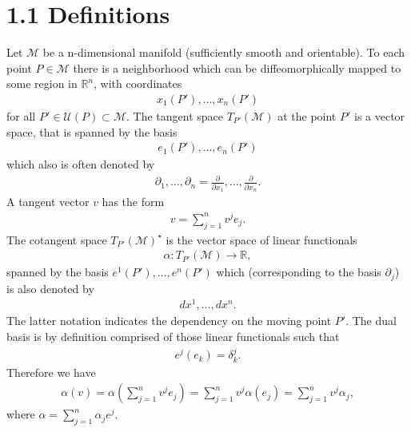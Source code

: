 \documentclass[letterpaper,10pt,english]{sphinxmanual}
\begin{document}
\section{1.1 Definitions}
\label{section-1.0:definitions}
Let \(\mathcal{M}\) be a n-dimensional manifold (sufficiently smooth and
orientable). To each point \(P \in \mathcal{M}\) there is a neighborhood
which can be diffeomorphically mapped to some region in \(\mathbb{R}^n\),
with coordinates
\begin{equation*}
\begin{split}x_1 (P'), \ldots, x_n (P')\end{split}
\end{equation*}
for all \(P' \in \mathcal{U} (P) \subset \mathcal{M}\). The tangent space
\(T_{P'} (\mathcal{M})\) at the point \(P'\) is a vector space, that
is spanned by the basis
\begin{equation*}
\begin{split}e_1 (P'), \ldots, e_n (P')\end{split}
\end{equation*}
which also is often denoted by
\begin{equation*}
\begin{split}\partial_1, \ldots, \partial_n =
 \frac{\partial}{\partial x_1}, \ldots,
 \frac{\partial}{\partial x_n}.\end{split}
\end{equation*}
A tangent vector \(v\) has the form
\begin{equation*}
\begin{split}v = \sum_{j = 1}^n v^j e_j .\end{split}
\end{equation*}
The cotangent space \(T_{P'}^{} (\mathcal{M})^{\star}\) is the vector space
of linear functionals
\begin{equation*}
\begin{split}\alpha : T_{P'} (\mathcal{M}) \rightarrow \mathbb{R},\end{split}
\end{equation*}
spanned by the basis \(e^1 (P'), \ldots, e^n (P')\)
which (corresponding to the basis \(\partial_j\)) is also denoted by
\begin{equation*}
\begin{split}d x^1,\ldots, d x^n.\end{split}
\end{equation*}
The latter notation indicates the dependency on the moving
point \(P'\). The dual basis is by definition comprised of those linear
functionals such that
\begin{equation*}
\begin{split}e^j (e_k) = \delta^j_k .\end{split}
\end{equation*}
Therefore we have
\begin{equation*}
\begin{split}\alpha (v) = \alpha \left( \sum_{j = 1}^n v^j e_j \right) =
\sum_{j = 1}^n v^j \alpha (e_j) = \sum_{j = 1}^n v^j \alpha_j,\end{split}
\end{equation*}
where \(\alpha = \sum_{j = 1}^n \alpha_j e^j\).
\end{document}
